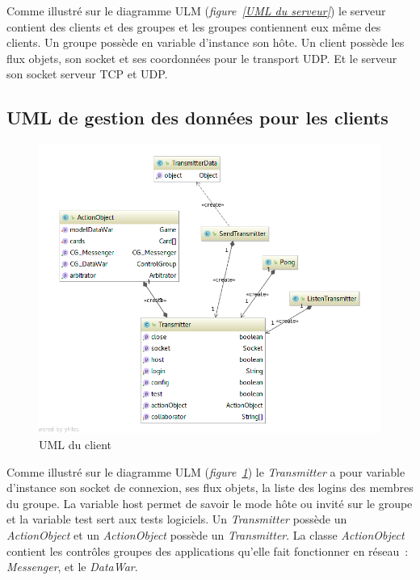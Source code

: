 \documentclass[a4paper,11pt]{report}
\begin{document}
    
    Comme illustré sur le diagramme ULM (\textit{figure~\ref{UML du serveur}}) le serveur contient des clients et des groupes et les groupes contiennent eux même des clients.
Un groupe possède en variable d’instance son hôte. 
Un client possède les flux objets, son socket et ses coordonnées pour le transport UDP.
Et le serveur son socket serveur TCP et UDP.





\subsection{UML de gestion des données pour les clients}
 \begin{figure}[th]
      \begin{center}
        \includegraphics[scale=0.6]{Assets/UML_client.png}
        \caption{UML du client}
        \label{UML du client}
      \end{center}
    \end{figure}
    
  Comme illustré sur le diagramme ULM (\textit{figure~\ref{UML du client}}) le \textit{Transmitter} a pour variable d’instance son socket de connexion, ses flux objets, la liste des logins des membres du groupe. La variable host permet de savoir le mode hôte ou invité sur le groupe et la variable test sert aux tests logiciels. Un \textit{Transmitter} possède un \textit{ActionObject} et un \textit{ActionObject} possède un \textit{Transmitter}. La classe \textit{ActionObject} contient les contrôles groupes des applications qu’elle fait fonctionner en réseau : \textit{Messenger}, et le \textit{DataWar}.
\end{document}
